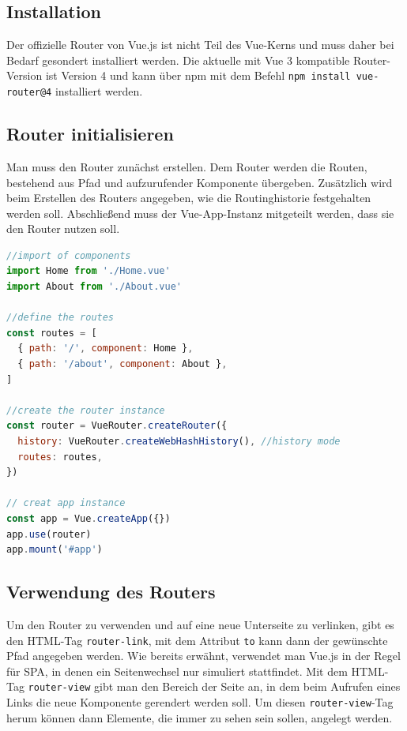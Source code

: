 \subsection*{Installation}
Der offizielle Router von Vue.js ist nicht Teil des Vue-Kerns und
muss daher bei Bedarf gesondert installiert werden.
Die aktuelle mit Vue 3 kompatible Router-Version ist Version 4 und
kann über npm mit dem Befehl \texttt{npm install vue-router@4} installiert werden.\cite{vueRouterInstallation}


\subsection*{Router initialisieren}
Man muss den Router zunächst erstellen.
Dem Router werden die Routen, bestehend aus Pfad und aufzurufender Komponente übergeben.
Zusätzlich wird beim Erstellen des Routers angegeben, wie die Routinghistorie festgehalten werden soll.
Abschließend muss der Vue-App-Instanz mitgeteilt werden, dass sie den Router nutzen soll. \cite{vueRouterGettingStarted}
\begin{lstlisting}[caption={Router initialisieren},language=javascript, label={lst:Router-initialisieren}]
//import of components
import Home from './Home.vue'
import About from './About.vue'

//define the routes
const routes = [
  { path: '/', component: Home },
  { path: '/about', component: About },
]

//create the router instance
const router = VueRouter.createRouter({
  history: VueRouter.createWebHashHistory(), //history mode
  routes: routes,
})

// creat app instance
const app = Vue.createApp({})
app.use(router)
app.mount('#app')
\end{lstlisting}

\subsection*{Verwendung des Routers}
Um den Router zu verwenden und auf eine neue Unterseite zu verlinken,
gibt es den HTML-Tag \texttt{router-link}, mit dem Attribut \texttt{to} kann dann der gewünschte Pfad angegeben werden.
Wie bereits erwähnt, verwendet man Vue.js in der Regel für SPA, in denen ein Seitenwechsel nur simuliert stattfindet.
Mit dem HTML-Tag \texttt{router-view} gibt man den Bereich der Seite an, in dem beim Aufrufen eines Links die neue Komponente gerendert werden soll.
Um diesen \texttt{router-view}-Tag herum können dann Elemente, die immer zu sehen sein sollen, angelegt werden. \cite{vueRouterGettingStarted}

